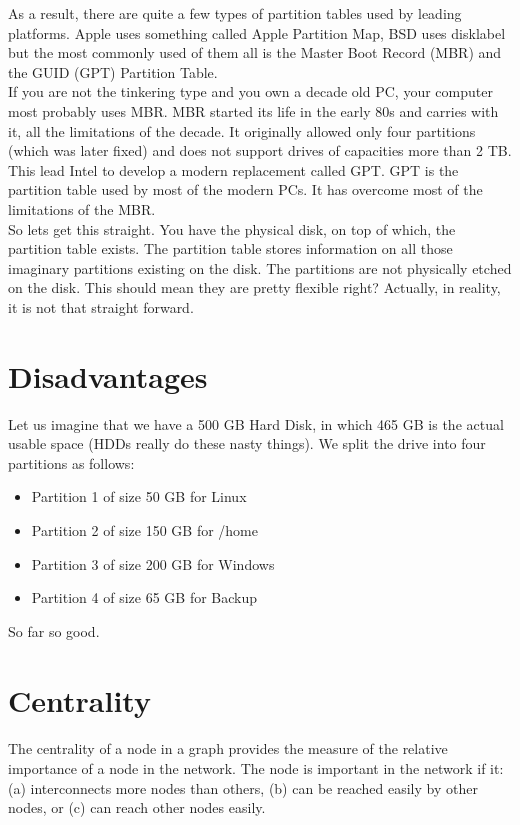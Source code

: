 As a result, there are quite a few types of partition tables used by leading
platforms. Apple uses something called Apple Partition Map, BSD uses disklabel
but the most commonly used of them all is the Master Boot Record (MBR) and the
GUID (GPT) Partition Table.\\

If you are not the tinkering type and you own a decade old PC, your computer
most probably uses MBR. MBR started its life in the early 80s and carries with
it, all the limitations of the decade. It originally allowed only four
partitions (which was later fixed) and does not support drives of capacities
more than 2 TB. This lead Intel to develop a modern replacement called GPT. GPT
is the partition table used by most of the modern PCs. It has overcome most of
the limitations of the MBR.\\

So lets get this straight. You have the physical disk, on top of which, the
partition table exists. The partition table stores information on all those
imaginary partitions existing on the disk. The partitions are not physically
etched on the disk. This should mean they are pretty flexible right? Actually,
in reality, it is not that straight forward.

\section{Disadvantages}
Let us imagine that we have a 500 GB Hard Disk, in which 465 GB is the actual
usable space (HDDs really do these nasty things). We split the drive into four
partitions as follows:

\begin{itemize}
    \item Partition 1 of size 50 GB for Linux
    \item Partition 2 of size 150 GB for /home
    \item Partition 3 of size 200 GB for Windows
    \item Partition 4 of size 65 GB for Backup
\end{itemize}

So far so good.


\section{Centrality}
\paragraph{}
The centrality of a node in a graph provides the measure of the relative importance
of a node in the network. The node is important in the network if it:
\newline (a) interconnects more nodes than others,
\newline (b) can be reached easily by other nodes, or 
\newline(c) can reach other nodes easily.
